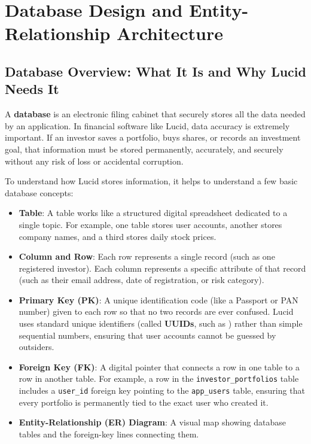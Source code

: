 \chapter{Database Design and Entity-Relationship Architecture}

\section{Database Overview: What It Is and Why Lucid Needs It}
A \textbf{database} is an electronic filing cabinet that securely stores all the data needed by an application. In financial software like Lucid, data accuracy is extremely important. If an investor saves a portfolio, buys shares, or records an investment goal, that information must be stored permanently, accurately, and securely without any risk of loss or accidental corruption.

To understand how Lucid stores information, it helps to understand a few basic database concepts:
\begin{itemize}
    \item \textbf{Table}: A table works like a structured digital spreadsheet dedicated to a single topic. For example, one table stores user accounts, another stores company names, and a third stores daily stock prices.
    \item \textbf{Column and Row}: Each row represents a single record (such as one registered investor). Each column represents a specific attribute of that record (such as their email address, date of registration, or risk category).
    \item \textbf{Primary Key (PK)}: A unique identification code (like a Passport or PAN number) given to each row so that no two records are ever confused. Lucid uses standard unique identifiers (called \textbf{UUIDs}, such as ) rather than simple sequential numbers, ensuring that user accounts cannot be guessed by outsiders.
    \item \textbf{Foreign Key (FK)}: A digital pointer that connects a row in one table to a row in another table. For example, a row in the \texttt{investor\_portfolios} table includes a \texttt{user\_id} foreign key pointing to the \texttt{app\_users} table, ensuring that every portfolio is permanently tied to the exact user who created it.
    \item \textbf{Entity-Relationship (ER) Diagram}: A visual map showing database tables and the foreign-key lines connecting them.
\end{itemize}

